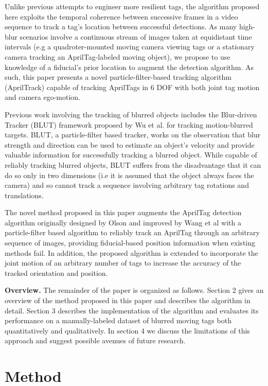 \documentclass[letterpaper, 10 pt, conference]{ieeeconf}
\begin{document}
Unlike previous attempts to engineer more resilient tags, the algorithm proposed here exploits the temporal coherence between successive frames in a video sequence to track a tag's location between successful detections. As many high-blur scenarios involve a continuous stream of images taken at equidistant time intervals (e.g a quadroter-mounted moving camera viewing tags or a stationary camera tracking an AprilTag-labeled moving object), we propose to use knowledge of a fiducial's prior location to augment the detection algorithm. As such, this paper presents a novel particle-filter-based tracking algorithm (AprilTrack) capable of tracking AprilTags in 6 DOF with both joint tag motion and camera ego-motion.
	
Previous work involving the tracking of blurred objects includes the Blur-driven Tracker (BLUT) framework proposed by Wu et al. \citep{BLUT} for tracking motion-blurred targets. BLUT, a particle-filter based tracker, works on the observation that blur strength and direction can be used to estimate an object's velocity and provide valuable information for successfully tracking a blurred object. While capable of reliably tracking blurred objects, BLUT suffers from the disadvantage that it can do so only in two dimensions (i.e it is assumed that the object always faces the camera) and so cannot track a sequence involving arbitrary tag rotations and translations.


The novel method proposed in this paper augments the AprilTag detection algorithm originally designed by Olson \citep{AprilTag} and improved by Wang et al \citep{AprilTag_2} with a particle-filter based algorithm to reliably track an AprilTag through an arbitrary sequence of images, providing fiducial-based position information when existing methods fail. In addition, the proposed algorithm is extended to incorporate the joint motion of an arbitrary number of tags to increase the accuracy of the tracked orientation and position.


\textbf{Overview.} The remainder of the paper is organized as follows. Section 2 gives an overview of the method proposed in this paper and describes the algorithm in detail. Section 3 describes the implementation of the algorithm and evaluates its performance on a manually-labeled dataset of blurred moving tags both quantitatively and qualitatively. In section 4 we discuss the limitations of this approach and suggest possible avenues of future research.

\section{Method}
\end{document}
